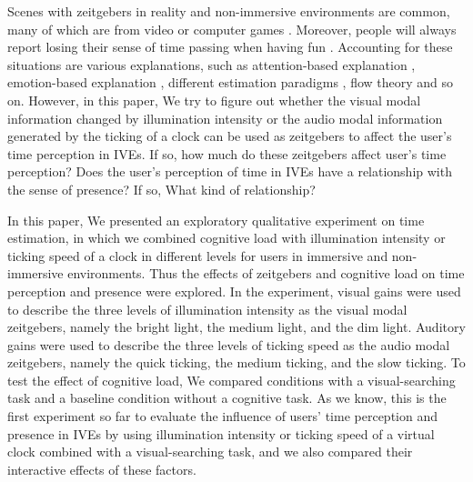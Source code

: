 \documentclass[sigconf]{acmart}
\begin{document}
Scenes with zeitgebers in reality and non-immersive environments are common, many of which are from video or computer games \cite{bruder2014threefolded,tobin2009video}. Moreover, people will always report losing their sense of time passing when having fun \cite{sanders2010time}. Accounting for these situations are various explanations, such as attention-based explanation \cite{block2010cognitive,张义芳2011时间知觉的影响因素研究综述}, emotion-based explanation \cite{angrilli1997influence,droit2007emotions}, different estimation paradigms \cite{block1997prospective,赵雪2012时距知觉研究综述}, flow theory \cite{nakamura2014concept,csikszentmihalyi1997finding} and so on. However, in this paper, We try to figure out whether the visual modal information changed by illumination intensity or the audio modal information generated by the ticking of a clock can be used as zeitgebers to affect the user's time perception in IVEs. If so, how much do these zeitgebers affect user's time perception? Does the user's perception of time in IVEs have a relationship with the sense of presence? If so, What kind of relationship?


In this paper, We presented an exploratory qualitative experiment on time estimation, in which we combined cognitive load with illumination intensity or ticking speed of a clock in different levels for users in immersive and non-immersive environments. Thus the effects of zeitgebers and cognitive load on time perception and presence were explored. In the experiment, visual gains were used to describe the three levels of illumination intensity as the visual modal zeitgebers, namely the bright light, the medium light, and the dim light. Auditory gains were used to describe the three levels of ticking speed as the audio modal zeitgebers, namely the quick ticking, the medium ticking, and the slow ticking. To test the effect of cognitive load, We compared conditions with a visual-searching task and a baseline condition without a cognitive task. As we know, this is the first experiment so far to evaluate the influence of users' time perception and presence in IVEs by using illumination intensity or ticking speed of a virtual clock combined with a visual-searching task, and we also compared their interactive effects of these factors.
\end{document}
